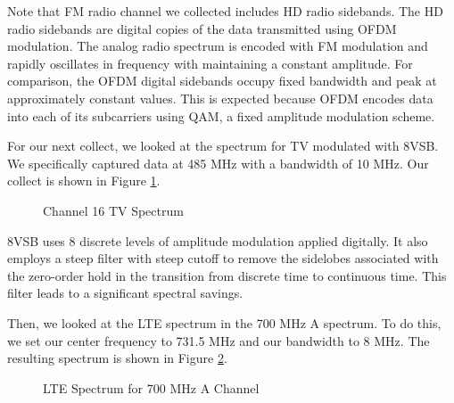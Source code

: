 \documentclass{article}
\begin{document}
Note that FM radio channel we collected includes HD radio sidebands. The HD radio sidebands are digital copies of the data transmitted using OFDM modulation. The analog radio spectrum is encoded with FM modulation and rapidly oscillates in frequency with maintaining a constant amplitude. For comparison, the OFDM digital sidebands occupy fixed bandwidth and peak at approximately constant values. This is expected because OFDM encodes data into each of its subcarriers using QAM, a fixed amplitude modulation scheme. 

For our next collect, we looked at the spectrum for TV modulated with 8VSB. We specifically captured data at 485 MHz with a bandwidth of 10 MHz. Our collect is shown in Figure \ref{fig::8vsb_spectrum}.

\begin{figure}[H]
	\centerline{}
	\caption{Channel 16 TV Spectrum}
	\label{fig::8vsb_spectrum}
\end{figure}


8VSB uses 8 discrete levels of amplitude modulation applied digitally. It also employs a steep filter with steep cutoff to remove the sidelobes associated with the zero-order hold in the transition from discrete time to continuous time. This filter leads to a significant spectral savings.
 
Then, we looked at the LTE spectrum in the 700 MHz A spectrum. To do this, we set our center frequency to 731.5 MHz and our bandwidth to 8 MHz. The resulting spectrum is shown in Figure \ref{fig::lte_spectrum}.

\begin{figure}[H]
	\centerline{}
	\caption{LTE Spectrum for 700 MHz A Channel}
	\label{fig::lte_spectrum}
\end{figure}
\end{document}
